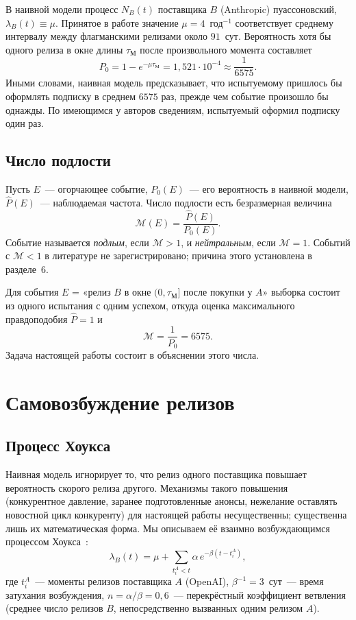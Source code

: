 \documentclass[11pt,a4paper]{article}
\newcommand{\tM}{\tau_{\mathrm{М}}}
\newcommand{\Mp}{\mathcal{M}}
\begin{document}
В наивной модели процесс $N_B(t)$ поставщика $B$ (Anthropic) пуассоновский, $\lambda_B(t)\equiv\mu$. Принятое в работе значение $\mu = 4$~год$^{-1}$ соответствует среднему интервалу между флагманскими релизами около $91$~сут. Вероятность хотя бы одного релиза в окне длины $\tM$ после произвольного момента составляет
\begin{equation}
P_0 = 1 - e^{-\mu\tM} = 1{,}521\cdot10^{-4} \approx \frac{1}{6575}.
\label{eq:naive}
\end{equation}
Иными словами, наивная модель предсказывает, что испытуемому пришлось бы оформлять подписку в среднем $6575$ раз, прежде чем событие произошло бы однажды. По имеющимся у авторов сведениям, испытуемый оформил подписку один раз.

\subsection{Число подлости}

\begin{definition}
Пусть $E$~--- огорчающее событие, $P_0(E)$~--- его вероятность в наивной модели, $\hat P(E)$~--- наблюдаемая частота. Число подлости есть безразмерная величина
\[
\Mp(E) = \frac{\hat P(E)}{P_0(E)}.
\]
Событие называется \emph{подлым}, если $\Mp>1$, и \emph{нейтральным}, если $\Mp=1$. Событий с $\Mp<1$ в литературе не зарегистрировано; причина этого установлена в разделе~6.
\end{definition}

Для события $E$ = «релиз $B$ в окне $(0,\tM]$ после покупки у $A$» выборка состоит из одного испытания с одним успехом, откуда оценка максимального правдоподобия $\hat P = 1$ и
\begin{equation}
\Mp = \frac{1}{P_0} = 6575.
\label{eq:M}
\end{equation}
Задача настоящей работы состоит в объяснении этого числа.

\section{Самовозбуждение релизов}

\subsection{Процесс Хоукса}

Наивная модель игнорирует то, что релиз одного поставщика повышает вероятность скорого релиза другого. Механизмы такого повышения (конкурентное давление, заранее подготовленные анонсы, нежелание оставлять новостной цикл конкуренту) для настоящей работы несущественны; существенна лишь их математическая форма. Мы описываем её взаимно возбуждающимся процессом Хоукса~\cite{samovozb}:
\begin{equation}
\lambda_B(t) = \mu + \sum_{t_i^A < t} \alpha\, e^{-\beta (t - t_i^A)},
\label{eq:hawkes}
\end{equation}
где $t_i^A$~--- моменты релизов поставщика $A$ (OpenAI), $\beta^{-1} = 3$~сут~--- время затухания возбуждения, $n = \alpha/\beta = 0{,}6$~--- перекрёстный коэффициент ветвления (среднее число релизов $B$, непосредственно вызванных одним релизом $A$).
\end{document}
